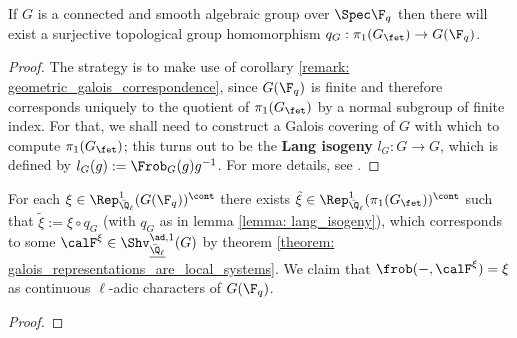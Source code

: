         \begin{lemma} \label{lemma: lang_isogeny}
            If $G$ is a connected and smooth algebraic group over $\Spec \F_q$ then there will exist a surjective topological group homomorphism $q_G: \pi_1(G_{\fet}) \to G(\F_q)$.
        \end{lemma}
            \begin{proof}
                The strategy is to make use of corollary \ref{remark: geometric_galois_correspondence}, since $G(\F_q)$ is finite and therefore corresponds uniquely to the quotient of $\pi_1(G_{\fet})$ by a normal subgroup of finite index. For that, we shall need to construct a Galois covering of $G$ with which to compute $\pi_1(G_{\fet})$; this turns out to be the \textbf{Lang isogeny} $l_G: G \to G$, which is defined by $l_G(g) := \Frob_G(g)g^{-1}$. For more details, see \cite[Theorem 4.4.17]{springer_linear_algebraic_groups}.
            \end{proof}
        \begin{proposition}
            For each $\xi \in \Rep^1_{\bar{\Q}_{\ell}}(G(\F_q))^{\cont}$ there exists $\tilde{\xi} \in \Rep^1_{\bar{\Q}_{\ell}}(\pi_1(G_{\fet}))^{\cont}$ such that $\tilde{\xi} := \xi \circ q_G$ (with $q_G$ as in lemma \ref{lemma: lang_isogeny}), which corresponds to some $\calF^{\xi} \in \Shv_{\underline{\bar{\Q}_{\ell}}}^{\ad, 1}(G)$ by theorem \ref{theorem: galois_representations_are_local_systems}. We claim that $\frob(-, \calF^{\xi}) = \xi$ as continuous $\ell$-adic characters of $G(\F_q)$.
        \end{proposition}
            \begin{proof}
                
            \end{proof}
            
